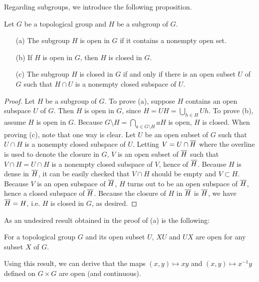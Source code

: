 Regarding subgroups, we introduce the following proposition.
\begin{prop}
    Let $G$ be a topological group and $H$ be a subgroup of $G$.
    \begin{enumerate}
        \item[(a)]
        {
            The subgroup $H$ is open in $G$ if it contains a nonempty open set.
        }
        \item[(b)]
        {
            If $H$ is open in $G$, then $H$ is closed in $G$.
        }
        \item[(c)]
        {
            The subgroup $H$ is closed in $G$ if and only if there is an open subset $U$ of $G$ such that $H\cap U$ is a nonempty closed subspace of $U$.
        }
    \end{enumerate}
\end{prop}
\begin{proof}
    Let $H$ be a subgroup of $G$.
    To prove (a), suppose $H$ contains an open subspace $U$ of $G$.
    Then $H$ is open in $G$, since $H=UH=\bigcup_{h\in H}Uh$.
    To prove (b), assume $H$ is open in $G$.
    Because $G\setminus H=\bigcap_{a\in G\setminus H} aH$ is open, $H$ is closed.
    When proving (c), note that one way is clear.
    Let $U$ be an open subset of $G$ such that $U\cap H$ is a nonempty closed subspace of $U$.
    Letting $V=U\cap\overline{H}$ where the overline is used to denote the closure in $G$, $V$ is an open subset of $\overline{H}$ such that $V\cap H=U\cap H$ is a nonempty closed subspace of $V$, hence of $\overline{H}$.
    Because $H$ is dense in $\overline{H}$, it can be easily checked that $V\cap H$ should be empty and $V\subset H$.
    Because $V$ is an open subspace of $\overline{H}$, $H$ turns out to be an open subspace of $\overline{H}$, hence a closed subspace of $\overline{H}$.
    Because the closure of $H$ in $\overline{H}$ is $\overline{H}$, we have $\overline{H}=H$, i.e. $H$ is closed in $G$, as desired.
\end{proof}
\begin{rmk}
    As an undesired result obtained in the proof of (a) is the following:
    \begin{center}
        For a topological group $G$ and its open subset $U$, $XU$ and $UX$ are open for any subset $X$ of $G$.
    \end{center}
    Using this result, we can derive that the maps $(x, y)\mapsto xy$ and $(x, y)\mapsto x^{-1}y$ defined on $G\times G$ are open (and continuous).
\end{rmk}

